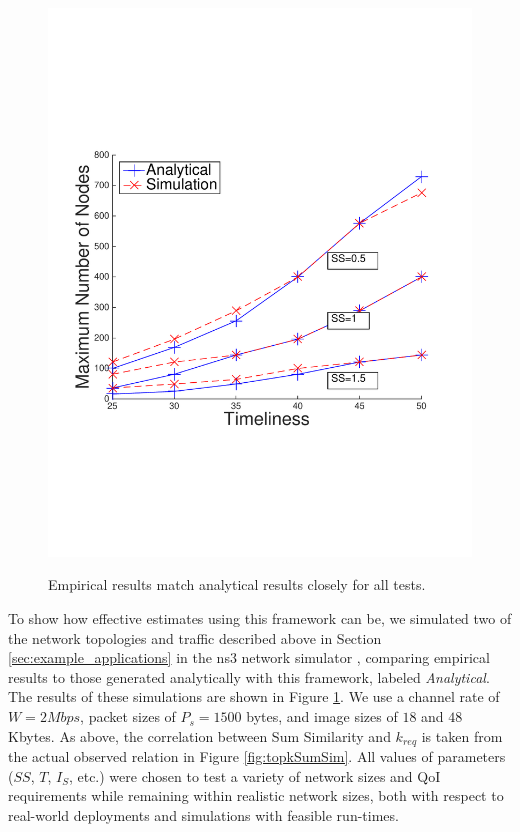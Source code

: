 \begin{figure}[]
{        \includegraphics[scale=0.40, clip=true, trim=12mm 65mm 20mm 65mm]{figures/scal_sim_results/color_2d/grid_scal_chernoff.pdf}
        \label{fig:scal_vs_qoi_grid}
        }
   \caption{Empirical results match analytical results closely for all tests.}
   \label{fig:scal_vs_qoi}
\end{figure}

To show how effective estimates using this framework can be, we simulated two of the network topologies and traffic described above in Section \ref{sec:example_applications} in the ns3 network simulator \cite{ns3}, comparing empirical results to those generated analytically with this framework, labeled \emph{Analytical}.  The results of these simulations are shown in Figure \ref{fig:scal_vs_qoi}.
We use a channel rate of $W= 2 Mbps$, packet sizes of $P_s = 1500$ bytes, and image sizes of $18$ and $48$ Kbytes.  As above, the correlation between Sum Similarity and $k_{req}$ is taken from the actual observed relation in Figure \ref{fig:topkSumSim}.  All values of parameters ($SS$, $T$, $I_S$, etc.) were chosen to test a variety of network sizes and QoI requirements while remaining within realistic network sizes, both with respect to real-world deployments and simulations with feasible run-times.



